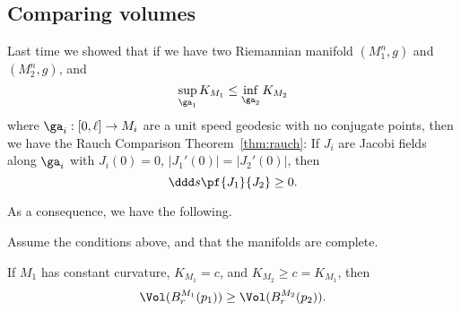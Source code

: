 
\subsection{Comparing volumes}
Last time we showed that if we have two Riemannian manifold $(M_1^n,g)$ and $(M_2^n,g)$, and 
\[
\sup_{\ga_1} K_{M_1}\le \inf_{\ga_2} K_{M_2}
\]
where $\ga_i:[0,\ell]\to M_i$ are a unit speed geodesic with no conjugate points, then we have the Rauch Comparison Theorem~\ref{thm:rauch}: If $J_i$ are Jacobi fields along $\ga_i$ with $J_i(0)=0$, $|J_1'(0)|=|J_2'(0)|$, then
\[
\ddd s\pf{J_1}{J_2}\ge 0.
\]

As a consequence, we have the following.
\begin{cor}
Assume the conditions above, and that the manifolds are complete.

If $M_1$ has constant curvature, $K_{M_1}=c$, and $K_{M_2}\ge c=K_{M_1}$, then
\[
\Vol(B_{r}^{M_1}(p_1))\ge \Vol(B_r^{M_2}(p_2)).
\]
\end{cor}
